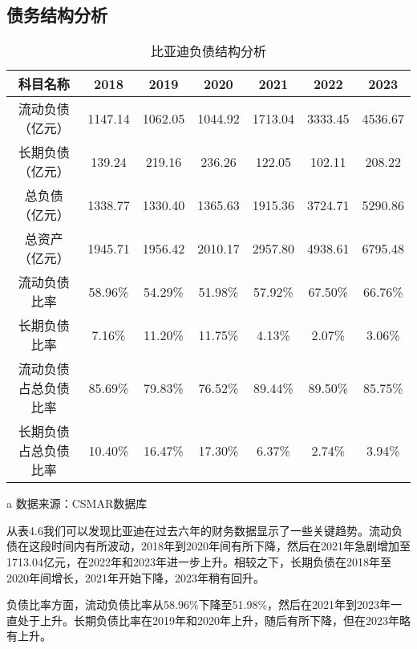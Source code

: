 \subsection{债务结构分析}
\begin{table}
  \centering
  \begin{threeparttable}[c]
    \caption{比亚迪负债结构分析}
    \label{tab:debt-structure}
    \begin{tabular}{ccccccc}
      \toprule
        科目名称 & 2018 & 2019 & 2020 & 2021 & 2022 & 2023 \\ 
      \midrule
        流动负债（亿元） & 1147.14  & 1062.05  & 1044.92  & 1713.04  & 3333.45  & 4536.67  \\ 
        长期负债（亿元） & 139.24  & 219.16  & 236.26  & 122.05  & 102.11  & 208.22  \\ 
        总负债（亿元） & 1338.77  & 1330.40  & 1365.63  & 1915.36  & 3724.71  & 5290.86  \\ 
        总资产（亿元） & 1945.71  & 1956.42  & 2010.17  & 2957.80  & 4938.61  & 6795.48  \\ 
        流动负债比率 & 58.96\% & 54.29\% & 51.98\% & 57.92\% & 67.50\% & 66.76\% \\ 
        长期负债比率 & 7.16\% & 11.20\% & 11.75\% & 4.13\% & 2.07\% & 3.06\% \\ 
        流动负债占总负债比率 & 85.69\% & 79.83\% & 76.52\% & 89.44\% & 89.50\% & 85.75\% \\ 
        长期负债占总负债比率 & 10.40\% & 16.47\% & 17.30\% & 6.37\% & 2.74\% & 3.94\% \\ 
      \bottomrule
    \end{tabular}
    \begin{tablenotes}
      \item [a] 数据来源：CSMAR数据库
    \end{tablenotes}
  \end{threeparttable}
\end{table}
从表4.6我们可以发现比亚迪在过去六年的财务数据显示了一些关键趋势。流动负债在这段时间内有所波动，2018年到2020年间有所下降，然后在2021年急剧增加至1713.04亿元，在2022年和2023年进一步上升。相较之下，长期负债在2018年至2020年间增长，2021年开始下降，2023年稍有回升。

负债比率方面，流动负债比率从58.96\%下降至51.98\%，然后在2021年到2023年一直处于上升。长期负债比率在2019年和2020年上升，随后有所下降，但在2023年略有上升。


